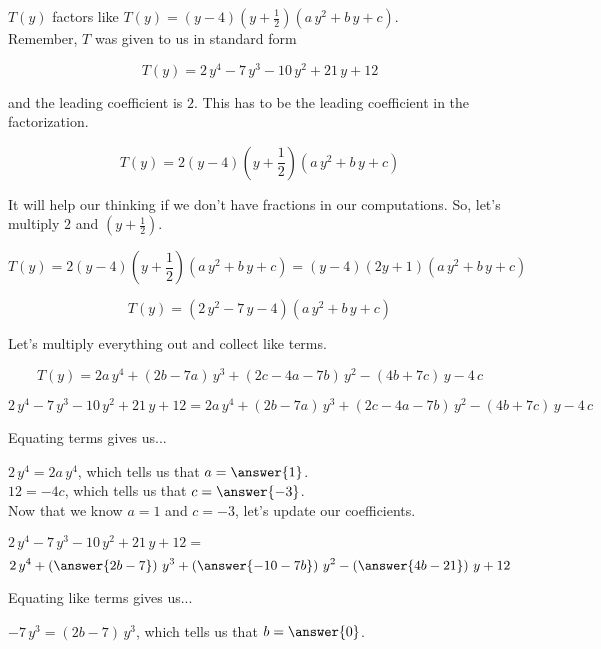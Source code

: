 \documentclass{ximera}
\begin{document}
\begin{explanation}



$T(y)$ factors like $T(y) = (y-4) \left(y+\frac{1}{2}\right) (a \, y^2 + b \, y + c)$. \\


Remember, $T$ was given to us in standard form

\[   T(y) = 2\, y^4 - 7 \, y^3 - 10 \, y^2 + 21 \, y + 12   \]


and the leading coefficient is $2$.  This has to be the leading coefficient in the factorization.

\[   T(y) = 2 (y-4) \left(y+\frac{1}{2}\right) (a \, y^2 + b \, y + c)   \]



 It will help our thinking if we don't have fractions in our computations. So, let's multiply $2$ and $\left(y+\frac{1}{2}\right)$.



\[
T(y) = 2 (y-4) \left(y+\frac{1}{2}\right) (a \, y^2 + b \, y + c) = (y-4) (2y+1) (a \, y^2 + b \, y + c)
\]


\[
T(y) = (2 \, y^2 - 7 \, y - 4) (a \, y^2 + b \, y + c)
\]


Let's multiply everything out and collect like terms.


\[
T(y) = 2 a \, y^4 + (2 b - 7 a) \, y^3 + (2c - 4 a - 7 b) \, y^2 - (4 b + 7 c) \, y - 4 \, c
\]


\[
2\, y^4 - 7 \, y^3 - 10 \, y^2 + 21 \, y + 12 = 2 a \, y^4 + (2 b - 7 a) \, y^3 + (2 c - 4 a - 7 b) \, y^2 - (4 b + 7 c) \, y - 4 \, c
\]


Equating terms gives us...


$2 \, y^4 = 2 a \, y^4$, which tells us that $a = \answer{1}$. \\

$12 = -4 c$, which tells us that $c =  \answer{-3}$. \\



Now that we know $a = 1$ and $c = -3$, let's update our coefficients.


$2\, y^4 - 7 \, y^3 - 10 \, y^2 + 21 \, y + 12 =$
\[
2 \, y^4 + \left( \answer{2 b - 7 } \right) \, y^3 + \left( \answer{-10 - 7 b} \right) \, y^2 - \left( \answer{4 b - 21} \right) \, y + 12
\]




Equating like terms gives us...


$-7 \, y^3 = (2 b - 7) \, y^3$, which tells us that $b = \answer{0}$. \\




\end{explanation}
\end{document}
